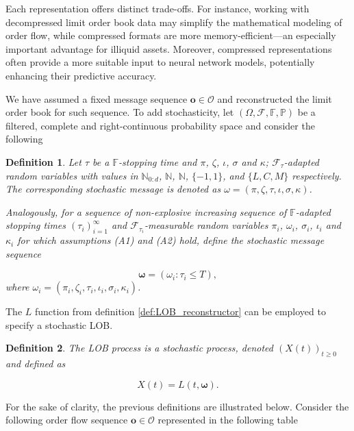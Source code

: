 \documentclass[10pt,a4paper,oneside]{article}
\newcommand{\N}{\mathbb{N}}
\newcommand{\Prob}{\mathbb{P}}
\newcommand{\Fil}{\mathbb{F}}
\newcommand{\SigAl}{\mathcal{F}}
\newtheorem{definition}{Definition}
\begin{document}
Each representation offers distinct trade-offs. For instance, working with decompressed limit order book data may simplify the mathematical modeling of order flow, while compressed formats are more memory-efficient—an especially important advantage for illiquid assets. Moreover, compressed representations often provide a more suitable input to neural network models, potentially enhancing their predictive accuracy.


We have assumed a fixed message sequence $\mathbf{o} \in \mathcal{O}$ and reconstructed the limit order book for such sequence. To add stochasticity, let $(\Omega, \SigAl, \Fil, \Prob)$ be a filtered, complete and right-continuous probability space and consider the following 

\begin{definition}
Let $\tau$ be a $\Fil$-stopping time and $\pi$, $\zeta$, $\iota$, $\sigma$ and $\kappa$; $\SigAl_{\tau}$-adapted random variables with values in $\N_{0:d}$, $\N$, $\N$, $\{-1, 1\}$, and $\{L, C, M\}$ respectively. The corresponding stochastic message is denoted as  $\omega = (\pi, \zeta, \tau, \iota, \sigma, \kappa)$.

Analogously, for a sequence of non-explosive increasing sequence of $\Fil$-adapted stopping times $(\tau_i)^{\infty}_{i = 1}$ and $\SigAl_{\tau_i}$-measurable random variables $\pi_i$, $\omega_i$, $\sigma_i$, $\iota_i$ and $\kappa_i$ for which assumptions (A1) and (A2) hold, define the stochastic message sequence

\begin{equation*}
\boldsymbol{\omega} = (\omega_i : \tau_i \leq T),
\end{equation*}
where $\omega_i = (\pi_i, \zeta_i, \tau_i, \iota_i, \sigma_i, \kappa_i)$. 
\label{def:stochastic_messages}
\end{definition}

The $L$ function from definition \ref{def:LOB_reconstructor} can be employed to specify a stochastic LOB.

\begin{definition} The LOB process is a stochastic process, denoted $(X(t))_{t \geq 0}$ and defined as

\begin{equation*}
X(t) = L(t, \boldsymbol{\omega}).
\end{equation*}
\label{def:lob_process}
\end{definition}

For the sake of clarity, the previous definitions are illustrated below. Consider the following order flow sequence $\mathbf{o} \in \mathcal{O}$ represented in the following table
\end{document}
